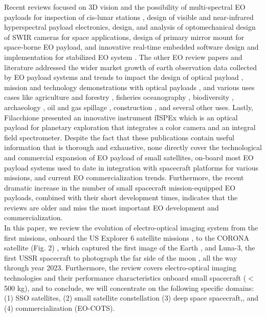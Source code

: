 \documentclass[final,5p,times,sort&compress,twocolumn]{elsarticle}
\begin{document}
Recent reviews focused on 3D vision and the possibility of multi-spectral EO payloads for inspection of cis-lunar stations \cite{corpino2020inspection}, design of visible and near-infrared hyperspectral payload electronics, design, and analysis of optomechanical design of SWIR cameras for space applications, design of primary mirror mount for space-borne EO payload, and innovative real-time embedded software design and implementation for stabilized EO system \cite{sastry2020advances}. The other EO review papers and literature addressed the wider market growth of earth observation data collected by EO payload systems and trends to impact the design of optical payload \cite{cronje2023}, mission and technology demonstrations with optical payloads \cite{cho2019high, thatavarthi2020payload, willoughby1996hyperspectral, mughal2021aalto, swenson2015electro, prentice2021design}, and various uses cases like agriculture and forestry  \cite{boyd2005satellite, fahey2020active}, fisheries oceanography \cite{santos2000fisheries}, biodiversity \cite{turner2003remote}, archaeology \cite{giardino2011history}, oil and gas spillage \cite{fingas1997review}, construction \cite{teizer20083d}, and several other uses.  Lastly,  Filacchione \cite{filacchione2022integral} presented an innovative instrument fISPEx which is an optical payload for planetary exploration that integrates a color camera and an integral field spectrometer. Despite the fact that these publications contain useful information that is thorough and exhaustive, none directly cover the technological and commercial expansion of EO payload of small satellites, on-board most EO payload systems used to date in integration with spacecraft platforms for various missions, and current EO commercialization trends. Furthermore, the recent dramatic increase in the number of small spacecraft mission-equipped EO payloads, combined with their short development times, indicates that the reviews are older and miss the most important EO development and commercialization.\\
In this paper, we review the evolution of electro-optical imaging system from the first missions, onboard the US Explorer 6 satellite missions \cite{christopherson20192019, judge1962observations}, to the CORONA satellite (Fig. 2) \cite{ruffner1995corona, altmaier2002digital, day1999eye, ur2003corona}, which captured the first image of the Earth \cite{house1986history}, and Luna-3, the first USSR spacecraft to photograph the far side of the moon \cite{siddiqi2018beyond}, all the way through year 2023. Furthermore, the review covers electro-optical imaging technologies and their performance characteristics onboard small spacecraft ($<$ 500 kg), and to conclude, we will concentrate on the following specific domains: (1) SSO satellites, (2) small satellite constellation (3) deep space spacecraft,, and (4) commercialization (EO-COTS).
\end{document}
